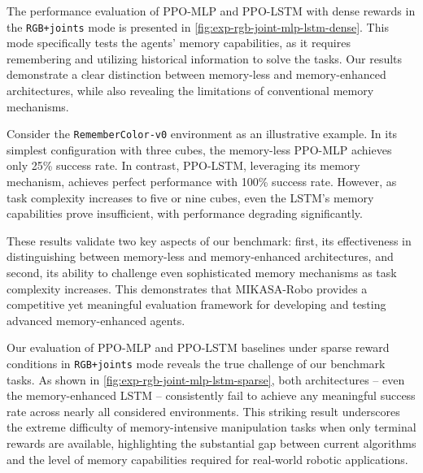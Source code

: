 The performance evaluation of PPO-MLP and PPO-LSTM with dense rewards in the \texttt{RGB+joints} mode is presented in \autoref{fig:exp-rgb-joint-mlp-lstm-dense}. This mode specifically tests the agents' memory capabilities, as it requires remembering and utilizing historical information to solve the tasks. Our results demonstrate a clear distinction between memory-less and memory-enhanced architectures, while also revealing the limitations of conventional memory mechanisms.

Consider the \texttt{RememberColor-v0} environment as an illustrative example. In its simplest configuration with three cubes, the memory-less PPO-MLP achieves only 25\% success rate. In contrast, PPO-LSTM, leveraging its memory mechanism, achieves perfect performance with 100\% success rate. However, as task complexity increases to five or nine cubes, even the LSTM's memory capabilities prove insufficient, with performance degrading significantly. 

These results validate two key aspects of our benchmark: first, its effectiveness in distinguishing between memory-less and memory-enhanced architectures, and second, its ability to challenge even sophisticated memory mechanisms as task complexity increases. This demonstrates that MIKASA-Robo provides a competitive yet meaningful evaluation framework for developing and testing advanced memory-enhanced agents.

Our evaluation of PPO-MLP and PPO-LSTM baselines under sparse reward conditions in \texttt{RGB+joints} mode reveals the true challenge of our benchmark tasks. As shown in \autoref{fig:exp-rgb-joint-mlp-lstm-sparse}, both architectures -- even the memory-enhanced LSTM -- consistently fail to achieve any meaningful success rate across nearly all considered environments. This striking result underscores the extreme difficulty of memory-intensive manipulation tasks when only terminal rewards are available, highlighting the substantial gap between current algorithms and the level of memory capabilities required for real-world robotic applications.

\newpage


\newpage







\newpage


